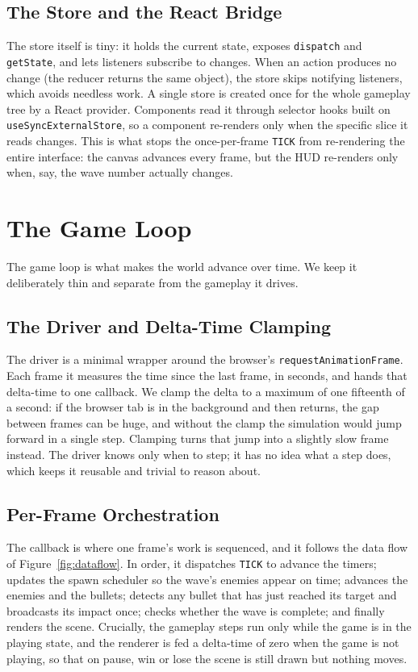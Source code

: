 \documentclass[12pt,a4paper]{report}
\begin{document}
\subsection{The Store and the React Bridge}

The store itself is tiny: it holds the current state, exposes \texttt{dispatch}
and \texttt{getState}, and lets listeners subscribe to changes. When an action
produces no change (the reducer returns the same object), the store skips
notifying listeners, which avoids needless work. A single store is created once
for the whole gameplay tree by a React provider. Components read it through
selector hooks built on \texttt{useSyncExternalStore}, so a component re-renders
only when the specific slice it reads changes. This is what stops the
once-per-frame \texttt{TICK} from re-rendering the entire interface: the canvas
advances every frame, but the HUD re-renders only when, say, the wave number
actually changes.

\section{The Game Loop}

The game loop is what makes the world advance over time. We keep it deliberately
thin and separate from the gameplay it drives.

\subsection{The Driver and Delta-Time Clamping}

The driver is a minimal wrapper around the browser's
\texttt{requestAnimationFrame}. Each frame it measures the time since the last
frame, in seconds, and hands that delta-time to one callback. We clamp the delta
to a maximum of one fifteenth of a second: if the browser tab is in the
background and then returns, the gap between frames can be huge, and without the
clamp the simulation would jump forward in a single step. Clamping turns that
jump into a slightly slow frame instead. The driver knows only when to step; it
has no idea what a step does, which keeps it reusable and trivial to reason
about.

\subsection{Per-Frame Orchestration}

The callback is where one frame's work is sequenced, and it follows the data
flow of Figure~\ref{fig:dataflow}. In order, it dispatches \texttt{TICK} to
advance the timers; updates the spawn scheduler so the wave's enemies appear on
time; advances the enemies and the bullets; detects any bullet that has just
reached its target and broadcasts its impact once; checks whether the wave is
complete; and finally renders the scene. Crucially, the gameplay steps run only
while the game is in the playing state, and the renderer is fed a delta-time of
zero when the game is not playing, so that on pause, win or lose the scene is
still drawn but nothing moves.
\end{document}
